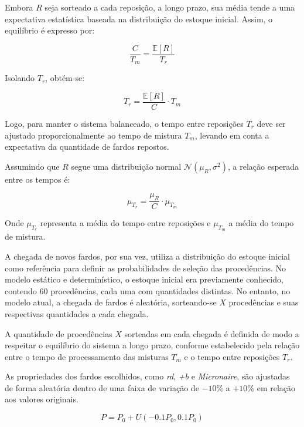 \documentclass[
    12pt,                %
    openright,           %
    oneside,             %
    a4paper,             %
    english,             %
    spanish,             %
    brazil               %
]{ufscar}
\begin{document}
Embora \( R \) seja sorteado a cada reposição, a longo prazo, sua média tende a uma expectativa estatística baseada na distribuição do estoque inicial. Assim, o equilíbrio é expresso por:

\begin{equation}
    \frac{C}{T_m} = \frac{\mathbb{E}[R]}{T_r}
\end{equation}

Isolando \( T_r \), obtém-se:

\begin{equation}
    T_r = \frac{\mathbb{E}[R]}{C} \cdot T_m
\end{equation}

Logo, para manter o sistema balanceado, o tempo entre reposições \( T_r \) deve ser ajustado proporcionalmente ao tempo de mistura \( T_m \), levando em conta a expectativa da quantidade de fardos repostos.

Assumindo que \( R \) segue uma distribuição normal \( \mathcal{N}(\mu_R, \sigma^2) \), a relação esperada entre os tempos é:

\begin{equation}
    \mu_{T_r} = \frac{\mu_R}{C} \cdot \mu_{T_m}
\end{equation}

Onde \( \mu_{T_r} \) representa a média do tempo entre reposições e \( \mu_{T_m} \) a média do tempo de mistura.

A chegada de novos fardos, por sua vez, utiliza a distribuição do estoque inicial como referência para definir as probabilidades de seleção das procedências. No modelo estático e determinístico, o estoque inicial era previamente conhecido, contendo 60 procedências, cada uma com quantidades distintas. No entanto, no modelo atual, a chegada de fardos é aleatória, sorteando-se \( X \) procedências e suas respectivas quantidades a cada chegada.

A quantidade de procedências \( X \) sorteadas em cada chegada é definida de modo a respeitar o equilíbrio do sistema a longo prazo, conforme estabelecido pela relação entre o tempo de processamento das misturas \( T_m \) e o tempo entre reposições \( T_r \).

As propriedades dos fardos escolhidos, como \textit{rd}, \textit{+b} e \textit{Micronaire}, são ajustadas de forma aleatória dentro de uma faixa de variação de \(-10\%\) a \(+10\%\) em relação aos valores originais.

\begin{equation}
    P = P_0 + U(-0.1 P_0, 0.1 P_0)
\end{equation}
\end{document}
